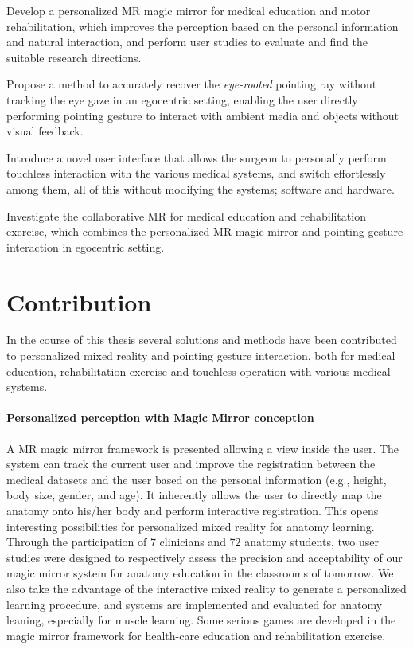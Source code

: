 \begin{description} [font=$\bullet$\scshape\bfseries]
	\item Develop a personalized MR magic mirror for medical education and motor rehabilitation, which improves the perception based on the personal information and natural interaction, and perform user studies to evaluate and find the suitable research directions.
	\item Propose a method to accurately recover the \textit{eye-rooted} pointing ray without tracking the eye gaze in an egocentric setting, enabling the user directly performing pointing gesture to interact with ambient media and objects without visual feedback.
	\item Introduce a novel user interface that allows the surgeon to personally perform touchless interaction with the various medical systems, and switch effortlessly among them, all of this without modifying the systems; software and hardware.
	\item Investigate the collaborative MR for medical education and rehabilitation exercise, which combines the personalized MR magic mirror and pointing gesture interaction in egocentric setting. 
\end{description}

\section{Contribution}
In the course of this thesis several solutions and methods have been contributed to personalized mixed reality and pointing gesture interaction, both for medical education, rehabilitation exercise and touchless operation with various medical systems.

\paragraph{Personalized perception with Magic Mirror conception}
A MR magic mirror framework is presented allowing a view inside the user. The system can track the current user and improve the registration between the medical datasets and the user based on the personal information (e.g., height, body size, gender, and age). It inherently allows the user to directly map the anatomy onto his/her body and perform interactive registration. This opens interesting possibilities for personalized mixed reality for anatomy learning. Through the participation of 7 clinicians and 72 anatomy students, two user studies were designed to respectively assess the precision and acceptability of our magic mirror system for anatomy education in the classrooms of tomorrow. We also take the advantage of the interactive mixed reality to generate a personalized learning procedure, and systems are implemented and evaluated for anatomy leaning, especially for muscle learning. Some serious games are developed in the magic mirror framework for health-care education and rehabilitation exercise.

